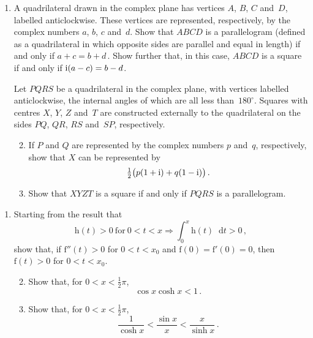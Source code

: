 \documentclass[a4, 11pt]{report}
\newlength{\qspace}
\newcounter{qnumber}
\newenvironment{question}%
 {\vspace{\qspace}
  \begin{enumerate}[\bfseries 1\quad][10]%
    \setcounter{enumi}{\value{qnumber}}%
    \item%
 }
{
  \end{enumerate}
  \filbreak
  \stepcounter{qnumber}
 }
\newenvironment{questionparts}[1][1]%
 {
  \begin{enumerate}[\bfseries (i)]%
    \setcounter{enumii}{#1}
    \addtocounter{enumii}{-1}
    \setlength{\itemsep}{5mm}
    \setlength{\parskip}{8pt}
 }
 {
  \end{enumerate}
 }
\renewcommand{\.}[1]{\ensuremath{\mathrm{#1}}}
\newcommand{\+}[1]{\ensuremath{\mathbf{#1}}}
\newcommand{\ud}{\mathop{}\!\mathrm{d}}
\begin{document}
\begin{question}
  A quadrilateral drawn in the complex plane has vertices $A$,
  $B$, $C$ and~$D$, labelled anticlockwise.  These vertices are
  represented, respectively, by the complex numbers $a$, $b$, $c$
  and~$d$.  Show that $ABCD$ is a parallelogram (defined as a quadrilateral
  in which  opposite sides are parallel and equal in length)
  if and only if
  $a+c =b+d\,$.  Show further that, in this case,
  $ABCD$ is a square if and only if ${\rm i}(a-c)=b-d$.

  Let $PQRS$ be a quadrilateral in the complex plane, with vertices
  labelled anticlockwise, the internal angles of which are all less
  than~$180^\circ$.  Squares with centres $X$, $Y$, $Z$ and~$T$ are
  constructed externally to the quadrilateral on the sides $PQ$, $QR$,
  $RS$ and~$SP$, respectively.

  \begin{questionparts}
  \item If $P$ and $Q$ are represented by the complex numbers $p$
    and~$q$, respectively, show that $X$ can be represented by
    \[
    \tfrac 12 \big( p(1+{\rm i} ) + q (1-{\rm i})\big) \,.
    \]
  \item Show that $XY\!ZT$ is a square if and only if $PQRS$ is a
    parallelogram.
  \end{questionparts}
\end{question}
	
\begin{question}
  Starting from the result that
  \[
  \.h(t) >0\ \mathrm{for}\ 0< t < x \Longrightarrow \int_0^x \.h(t)\ud t
  > 0 \,,
  \]
  show that, if $\.f''(t)>0$ for $0<t<x_0$ and $\.f(0)=\.f'(0) =0$,
  then $\.f(t)>0$ for $0<t<x_0$.

  \begin{questionparts}
  \item Show that,
for $0<x < \frac12\pi$,
 \[
\cos x \cosh x <1 
\,.
\] 

  \item Show that, for $0<x < \frac12\pi$,
    \[
    \frac 1 {\cosh x} < \frac {\sin x} x < \frac x {\sinh x} \,.
    \]

  \end{questionparts}
\end{question}
	
\end{document}

